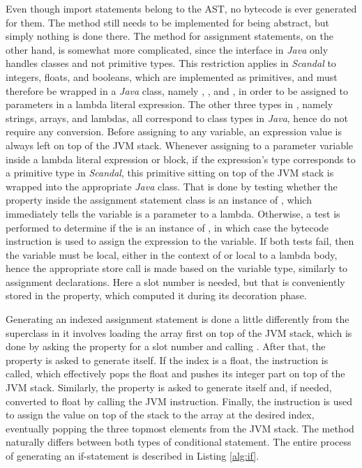 Even though import statements belong to the AST, no bytecode is ever generated for them. The  method still needs to be implemented for being abstract, but simply nothing is done there. The  method for assignment statements, on the other hand, is somewhat more complicated, since the  interface in \emph{Java} only handles classes and not primitive types. This restriction applies in \emph{Scandal} to integers, floats, and booleans, which are implemented as primitives, and must therefore be wrapped in a \emph{Java} class, namely , , and , in order to be assigned to parameters in a lambda literal expression. The other three types in , namely strings, arrays, and lambdas, all correspond to class types in \emph{Java}, hence do not require any conversion. Before assigning to any variable, an expression value is always left on top of the JVM stack. Whenever assigning to a parameter variable inside a lambda literal expression or block, if the expression's type corresponds to a primitive type in \emph{Scandal}, this primitive sitting on top of the JVM stack is wrapped into the appropriate \emph{Java} class. That is done by testing whether the  property inside the assignment statement class is an instance of , which immediately tells the variable is a parameter to a lambda. Otherwise, a test is performed to determine if the  is an instance of , in which case the  bytecode instruction is used to assign the expression to the variable. If both tests fail, then the variable must be local, either in the context of  or local to a lambda body, hence the appropriate store call is made based on the variable type, similarly to assignment declarations. Here a slot number is needed, but that is conveniently stored in the  property, which computed it during its decoration phase.

Generating an indexed assignment statement is done a little differently from the  superclass in it involves loading the array first on top of the JVM stack, which is done by asking the  property for a slot number and calling . After that, the  property is asked to generate itself. If the index is a float, the  instruction is called, which effectively pops the float and pushes its integer part on top of the JVM stack. Similarly, the  property is asked to generate itself and, if needed, converted to float by calling the  JVM instruction. Finally, the  instruction is used to assign the value on top of the stack to the array at the desired index, eventually popping the three topmost elements from the JVM stack. The  method naturally differs between both types of conditional statement. The entire process of generating an if-statement is described in Listing \ref{alg:if}.

